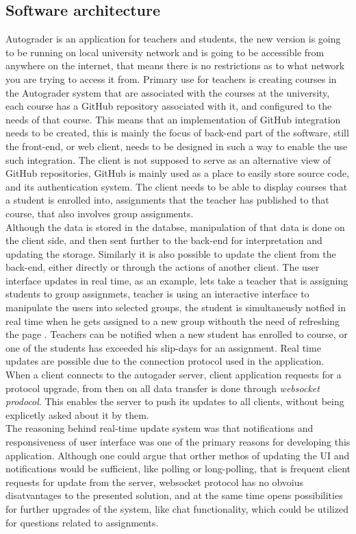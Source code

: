 \subsection{Software architecture}
Autograder is an application for teachers and students, the new version is going to be running on local university network and is going to be accessible from anywhere on the internet, that means there is no restrictions as to what network you are trying to access it from. Primary use for teachers is creating courses in the Autograder system that are associated with the courses at the university, each course has a GitHub repository associated with it, and configured to the needs of that course. This means that an implementation of GitHub integration needs to be created, this is mainly the focus of back-end part of the software, still the front-end, or web client, needs to be designed in such a way to enable the use such integration. The client is not supposed to serve as an alternative view of GitHub repositories, GitHub is mainly used as a place to easily store source code, and its authentication system. The client needs to be able to display courses that a student is enrolled into, assignments that the teacher has published to that course, that also involves group assignments.
\\Although the data is stored in the databse, manipulation of that data is done on the client side, and then sent further to the back-end for interpretation and updating the storage. Similarly it is also possible to update the client from the back-end, either directly or through the actions of another client. The user interface updates in real time, as an example, lets take a teacher that is assigning students to group assignmets, teacher is using an interactive interface to manipulate the users into selected groups, the student is simultaneusly notfied in real time when he gets assigned to a new group withouth the need of refreshing the page . Teachers can be notified when a new student has enrolled to course, or one of the students has exceeded his slip-days for an assignment. Real time updates are possible due to the connection protocol used in the application. When a client connects to the autogader server, client application requests for a protocol upgrade, from then on all data transfer is done through \emph{websocket prodocol}\cite{websocket}. This enables the server to push its updates to all clients, without being explicetly asked about it by them.
\\The reasoning behind real-time update system was that notifications and responsiveness of user interface was one of the primary reasons for developing this application. Although one could argue that orther methos of updating the UI and notifications would be sufficient, like polling or long-polling, that is frequent client requests for update from the server, websocket protocol has no obvoius disatvantages to the presented solution, and at the same time opens possibilities for further upgrades of the system, like chat functionality, which could be utilized for questions related to assignments.
